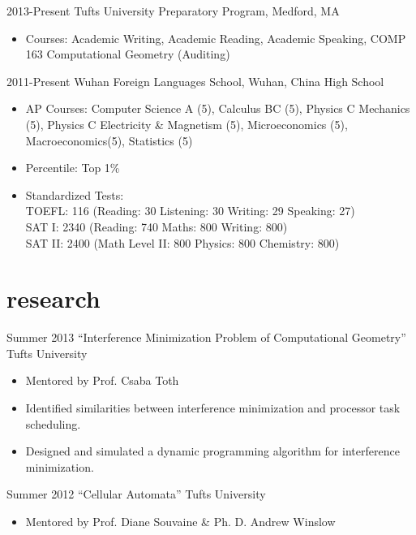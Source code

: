 \documentclass[]{friggeri-cv} %
\newenvironment{citemize}{\begin{itemize}[leftmargin=12pt]\vspace{-10pt}}{\end{itemize}}
\begin{document}
\begin{entrylist}
\entry
{2013-Present}
{Tufts University Preparatory Program, Medford, MA}
{}
{\begin{citemize}
  \item{Courses: Academic Writing, Academic Reading, Academic Speaking, COMP 163 Computational Geometry (Auditing)}
\end{citemize}}
\entry
{2011-Present}
{Wuhan Foreign Languages School, Wuhan, China}
{High School}
{\begin{citemize}
  \item{AP Courses: Computer Science A (5), Calculus BC (5), Physics C Mechanics (5), Physics C Electricity \& Magnetism (5), Microeconomics (5), Macroeconomics(5), Statistics (5)}
  \item{Percentile: Top 1\%}
  \item{Standardized Tests: \\
    TOEFL: 116 (Reading: 30 Listening: 30 Writing: 29 Speaking: 27)\\
    SAT I: 2340 (Reading: 740 Maths: 800 Writing: 800) \\
    SAT II: 2400 (Math Level II: 800 Physics: 800 Chemistry: 800)}
\end{citemize}}
\end{entrylist}


\section{research}

\begin{entrylist}
\entry
{Summer 2013}
{``Interference Minimization Problem of Computational Geometry''}
{Tufts University}
{\begin{citemize}
  \item{Mentored by Prof. Csaba Toth}
  \item{Identified similarities between interference minimization and processor task scheduling. }
  \item{Designed and simulated a dynamic programming algorithm for interference minimization. }
\end{citemize}}
\entry
{Summer 2012}
{``Cellular Automata''}
{Tufts University}
{\begin{citemize}
  \item{Mentored by Prof. Diane Souvaine \& Ph. D. Andrew Winslow}
\end{citemize}}
\end{entrylist}
\end{document}
